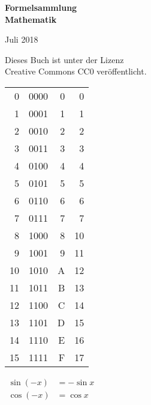 \documentclass[a4paper,10pt,fleqn,twocolumn,twoside,openany]{scrbook}
\numberwithin{equation}{chapter}
\newenvironment{ttsection}{\ttfamily}{\par}
\theoremstyle{Definition}
\begin{document}
\setlength{\abovedisplayskip}{6pt}
\setlength{\belowdisplayskip}{6pt}
\setlength{\abovedisplayshortskip}{6pt}
\setlength{\belowdisplayshortskip}{6pt}
\setlength{\abovecaptionskip}{2pt plus 2pt minus 1pt}

\begin{titlepage}
\centering
\phantom{x}

\vspace{20em}
{\noindent\Huge\sffamily\textbf{Formelsammlung\\
Mathematik}}

\vspace{2em}
{\Large Juli 2018}\\
\end{titlepage}

\thispagestyle{empty}

\noindent
Dieses Buch ist unter der Lizenz\\
Creative Commons CC0 veröffentlicht.
\vspace{8em}

\noindent
\begin{ttsection}
\begin{tabular}{r|r|r|r}
 0 & 0000 & 0 &  0\\
 1 & 0001 & 1 &  1\\
 2 & 0010 & 2 &  2\\
 3 & 0011 & 3 &  3\\
\noalign{\vspace{1em}}
 4 & 0100 & 4 &  4\\
 5 & 0101 & 5 &  5\\
 6 & 0110 & 6 &  6\\
 7 & 0111 & 7 &  7\\
\noalign{\vspace{1em}}
 8 & 1000 & 8 & 10\\
 9 & 1001 & 9 & 11\\
10 & 1010 & A & 12\\
11 & 1011 & B & 13\\
\noalign{\vspace{1em}}
12 & 1100 & C & 14\\
13 & 1101 & D & 15\\
14 & 1110 & E & 16\\
15 & 1111 & F & 17
\end{tabular}
\end{ttsection}

\newpage
\noindent
$\!\begin{aligned}
\sin(-x) &= -\sin x\\
\cos(-x) &= \cos x
\end{aligned}$
\vspace{1em}
\end{document}

